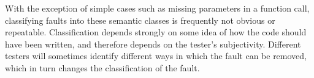 With the exception of simple cases such as missing parameters in a
function call, classifying faults into these semantic classes is
frequently not obvious or repeatable.  
Classification depends strongly on some idea of how the code should
have been written, and therefore depends on the tester's subjectivity.
Different testers will sometimes identify different ways in which the
fault can be removed, which in turn changes the classification of the
fault.

